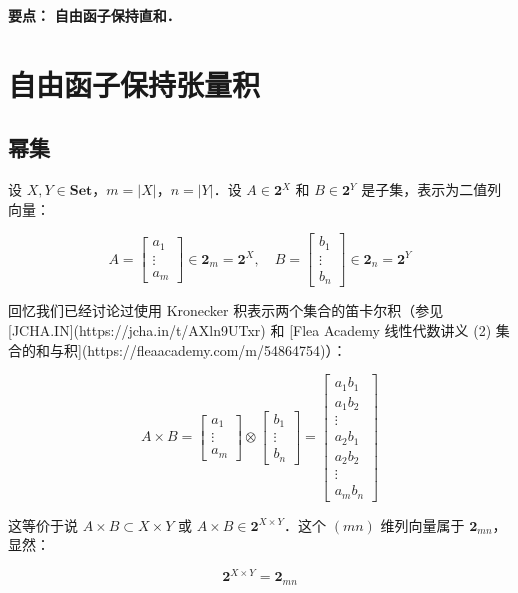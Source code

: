 \documentclass[10pt, openany]{book}
\begin{document}
\textbf{要点：}
\textbf{自由函子保持直和．}

\chapter{自由函子保持张量积}

\section{幂集}

设 $X,Y \in \textbf{Set}$，$m = |X|$，$n = |Y|$．设 $A \in \mathbf{2}^X$ 和 $B \in \mathbf{2}^Y$ 是子集，表示为二值列向量：

$$
A = \begin{bmatrix} a_1 \\ \vdots \\ a_m \end{bmatrix} \in \mathbf{2}_m = \mathbf{2}^X,\quad 
B = \begin{bmatrix} b_1 \\ \vdots \\ b_n \end{bmatrix} \in \mathbf{2}_n = \mathbf{2}^Y
$$

回忆我们已经讨论过使用 Kronecker 积表示两个集合的笛卡尔积（参见 [JCHA.IN](https://jcha.in/t/AXln9UTxr) 和 [Flea Academy 线性代数讲义 (2) 集合的和与积](https://fleaacademy.com/m/54864754)）：

$$
A \times B = \begin{bmatrix}a_1 \\ \vdots \\ a_m\end{bmatrix} \otimes \begin{bmatrix}b_1 \\ \vdots \\ b_n\end{bmatrix} 
= \begin{bmatrix}a_1 b_1 \\ a_1 b_2 \\ \vdots \\ a_2 b_1 \\ a_2 b_2 \\ \vdots \\ a_m b_n \end{bmatrix}
$$

这等价于说 $A \times B \subset X \times Y$ 或 $A \times B \in \mathbf{2}^{X \times Y}$．这个 $(mn)$ 维列向量属于 $\mathbf{2}_{mn}$，显然：

$$
\mathbf{2}^{X \times Y} = \mathbf{2}_{mn}
$$
\end{document}
